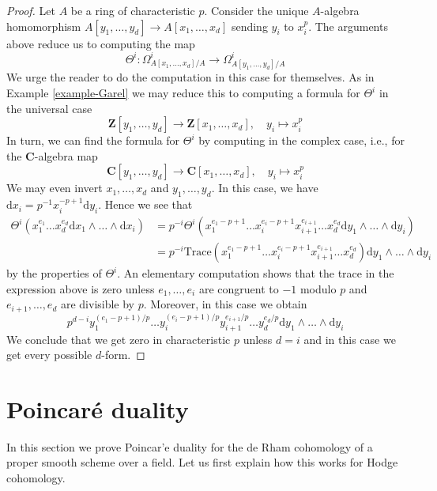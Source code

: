 \begin{proof}
\medskip\noindent
Let $A$ be a ring of characteristic $p$. Consider the unique $A$-algebra
homomorphism $A[y_1, \ldots, y_d] \to A[x_1, \ldots, x_d]$
sending $y_i$ to $x_i^p$. The arguments above
reduce us to computing the map
$$
\Theta^i : \Omega^i_{A[x_1, \ldots, x_d]/A} \to
\Omega^i_{A[y_1, \ldots, y_d]/A}
$$
We urge the reader to do the computation in this case for themselves.
As in Example \ref{example-Garel} we may reduce this to computing
a formula for $\Theta^i$ in the universal case
$$
\mathbf{Z}[y_1, \ldots, y_d] \to \mathbf{Z}[x_1, \ldots, x_d],\quad
y_i \mapsto x_i^p
$$
In turn, we can find the formula for $\Theta^i$ by computing in the complex
case, i.e., for the $\mathbf{C}$-algebra map
$$
\mathbf{C}[y_1, \ldots, y_d] \to \mathbf{C}[x_1, \ldots, x_d],\quad
y_i \mapsto x_i^p
$$
We may even invert $x_1, \ldots, x_d$ and $y_1, \ldots, y_d$.
In this case, we have $\text{d}x_i = p^{-1} x_i^{- p + 1}\text{d}y_i$.
Hence we see that
\begin{align*}
\Theta^i(
x_1^{e_1} \ldots x_d^{e_d} \text{d}x_1 \wedge \ldots \wedge \text{d}x_i)
& =
p^{-i} \Theta^i(
x_1^{e_1 - p + 1} \ldots x_i^{e_i - p + 1} x_{i + 1}^{e_{i + 1}} \ldots
x_d^{e_d} \text{d}y_1 \wedge \ldots \wedge \text{d}y_i ) \\
& =
p^{-i} \text{Trace}(x_1^{e_1 - p + 1} \ldots x_i^{e_i - p + 1}
x_{i + 1}^{e_{i + 1}} \ldots x_d^{e_d})
\text{d}y_1 \wedge \ldots \wedge \text{d}y_i
\end{align*}
by the properties of $\Theta^i$. An elementary computation shows
that the trace in the expression above is zero unless
$e_1, \ldots, e_i$ are congruent to $-1$ modulo $p$
and $e_{i + 1}, \ldots, e_d$ are divisible by $p$.
Moreover, in this case we obtain
$$
p^{d - i} y_1^{(e_1 - p + 1)/p} \ldots y_i^{(e_i - p + 1)/p}
y_{i + 1}^{e_{i + 1}/p} \ldots y_d^{e_d/p}
\text{d}y_1 \wedge \ldots \wedge \text{d}y_i
$$
We conclude that we get zero in characteristic $p$ unless $d = i$
and in this case we get every possible $d$-form.
\end{proof}








\section{Poincar\'e duality}
\label{section-poincare-duality}

\noindent
In this section we prove Poincar'e duality for the de Rham cohomology
of a proper smooth scheme over a field. Let us first explain how this
works for Hodge cohomology.


